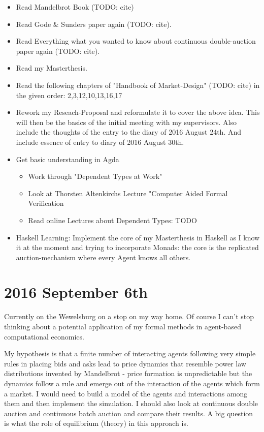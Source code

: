 \begin{itemize}
\item Read Mandelbrot Book (TODO: cite)
\item Read Gode \& Sunders paper again (TODO: cite).
\item Read Everything what you wanted to know about continuous double-auction paper again (TODO: cite).
\item Read my Masterthesis.
\item Read the following chapters of "Handbook of Market-Design" (TODO: cite) in the given order: 2,3,12,10,13,16,17
\item Rework my Reseach-Proposal and reformulate it to cover the above idea. 
This will then be the basics of the initial meeting with my supervisors. Also include the thoughts of the entry to the diary of 2016 August 24th. And include essence of entry to diary of 2016 August 30th.
\item Get basic understanding in Agda 
	\begin{itemize}
	\item Work through "Dependent Types at Work"
	\item Look at Thorsten Altenkirchs Lecture "Computer Aided Formal Verification
	\item Read online Lectures about Dependent Types: TODO
	\end{itemize}
\item Haskell Learning: Implement the core of my Masterthesis in Haskell as I know it at the moment and trying to incorporate Monads: the core is the replicated auction-mechanism where every Agent knows all others.
\end{itemize}

\section*{2016 September 6th}
Currently on the Wewelsburg on a stop on my way home. Of course I can't stop thinking about a potential application of my formal methods in agent-based computational economics. \bigskip

My hypothesis is that a finite number of interacting agents following very simple rules in placing bids and asks lead to price dynamics that resemble power law distributions invented by Mandelbrot - price formation is unpredictable but the dynamics follow a rule and emerge out of the interaction of the agents which form a market. I would need to build a model of the agents and interactions among them and then implement the simulation. I should also look at continuous double auction and continuous batch auction and compare their results. A big question is what the role of equilibrium (theory) in this approach is.

